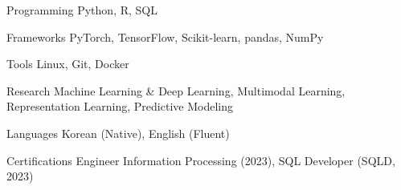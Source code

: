 \documentclass[11pt, a4paper]{awesome-cv}
\let\origcvsection\cvsection
\renewcommand{\cvsection}[1]{\needspace{7\baselineskip}\origcvsection{#1}}
\let\origcvsubsection\cvsubsection
\renewcommand{\cvsubsection}[1]{\needspace{5\baselineskip}\origcvsubsection{#1}}
\begin{document}
\vspace{1mm}

\begin{cvskills}

  \cvskill
    {Programming}
    {Python, R, SQL}

  \cvskill
    {Frameworks}
    {PyTorch, TensorFlow, Scikit-learn, pandas, NumPy}

  \cvskill
    {Tools}
    {Linux, Git, Docker}

  \cvskill
    {Research}
    {Machine Learning \& Deep Learning, Multimodal Learning, Representation Learning, Predictive Modeling}

  \cvskill
    {Languages}
    {Korean (Native), English (Fluent)}

  \cvskill
    {Certifications}
    {Engineer Information Processing (2023), SQL Developer (SQLD, 2023)}

\end{cvskills}

\vspace{1mm}

\end{document}
